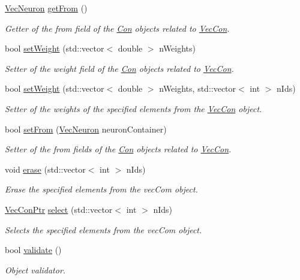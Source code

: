 \begin{DoxyCompactItemize}
\hyperlink{class_vec_neuron}{VecNeuron} \hyperlink{class_vec_con_ad9dc02872d29a1a58f5079457c3f8001}{getFrom} ()
\begin{DoxyCompactList}\small\item\em Getter of the from field of the \hyperlink{class_con}{Con} objects related to \hyperlink{class_vec_con}{VecCon}. \end{DoxyCompactList}\item 
bool \hyperlink{class_vec_con_afff0a663e82c72ebb6edf512c664013e}{setWeight} (std::vector$<$ double $>$ nWeights)
\begin{DoxyCompactList}\small\item\em Setter of the weight field of the \hyperlink{class_con}{Con} objects related to \hyperlink{class_vec_con}{VecCon}. \end{DoxyCompactList}\item 
bool \hyperlink{class_vec_con_accb6c8bb2215a7c575191302dc09fdf2}{setWeight} (std::vector$<$ double $>$ nWeights, std::vector$<$ int $>$ nIds)
\begin{DoxyCompactList}\small\item\em Setter of the weights of the specified elements from the \hyperlink{class_vec_con}{VecCon} object. \end{DoxyCompactList}\item 
bool \hyperlink{class_vec_con_a280ee1e24c44c8aeff1c4c4076322b71}{setFrom} (\hyperlink{class_vec_neuron}{VecNeuron} neuronContainer)
\begin{DoxyCompactList}\small\item\em Setter of the from fields of the \hyperlink{class_con}{Con} objects related to \hyperlink{class_vec_con}{VecCon}. \end{DoxyCompactList}\item 
void \hyperlink{class_vec_con_a930078dc6021e192d9a01bb520de66ab}{erase} (std::vector$<$ int $>$ nIds)
\begin{DoxyCompactList}\small\item\em Erase the specified elements from the vecCom object. \end{DoxyCompactList}\item 
\hyperlink{_a_m_o_r_e_8h_a046825e30d0ea2676a07e83f08f8ef00}{VecConPtr} \hyperlink{class_vec_con_a6fe488b3fe3834fe7cf5553fb4471c78}{select} (std::vector$<$ int $>$ nIds)
\begin{DoxyCompactList}\small\item\em Selects the specified elements from the vecCom object. \end{DoxyCompactList}\item 
bool \hyperlink{class_vec_con_af008396d3982fb7ccf1af9618b89937c}{validate} ()
\begin{DoxyCompactList}\small\item\em Object validator. \end{DoxyCompactList}\end{DoxyCompactItemize}


